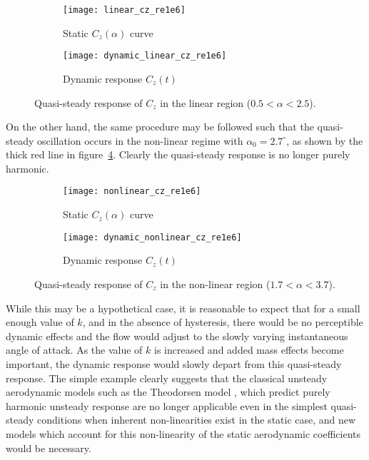 \begin{figure}[h]
	\centering
	\begin{subfigure}[b]{0.45\textwidth}
		\centering
		\texttt{[image: linear\_cz\_re1e6]}
		\caption{Static $C_{z}(\alpha)$ curve}
		\label{fig:static_linear}
	\end{subfigure}
	\begin{subfigure}[b]{0.45\textwidth}
		\centering
		\texttt{[image: dynamic\_linear\_cz\_re1e6]}
		\caption{Dynamic response $C_{z}(t)$}
		\label{fig:dynamic_linear}
	\end{subfigure}
	\caption{Quasi-steady response of $C_{z}$ in the linear region ($0.5<\alpha<2.5$).}
	\label{fig:linear_cz_response}
\end{figure}
On the other hand, the same procedure may be followed such that the quasi-steady oscillation occurs in the non-linear regime with $\alpha_{0}=2.7^{\circ}$, as shown by the thick red line in figure~\ref{fig:static_nonlinear}. Clearly the quasi-steady response is no longer purely harmonic.
\begin{figure}[h]
	\centering
	\begin{subfigure}[b]{0.45\textwidth}
		\centering
		\texttt{[image: nonlinear\_cz\_re1e6]}
		\caption{Static $C_{z}(\alpha)$ curve}
		\label{fig:static_nonlinear}
	\end{subfigure}
	\begin{subfigure}[b]{0.45\textwidth}
		\centering
		\texttt{[image: dynamic\_nonlinear\_cz\_re1e6]}
		\caption{Dynamic response $C_{z}(t)$}
		\label{fig:dynamic_nonlinear}
	\end{subfigure}
	\caption{Quasi-steady response of $C_{z}$ in the non-linear region ($1.7<\alpha<3.7$).}
	\label{fig:nonlinear_cz_response}
\end{figure}
While this may be a hypothetical case, it is reasonable to expect that for a small enough value of $k$, and in the absence of hysteresis, there would be no perceptible dynamic effects and the flow would adjust to the slowly varying instantaneous angle of attack. As the value of $k$ is increased and added mass effects become important, the dynamic response would slowly depart from this quasi-steady response. The simple example clearly suggests that the classical unsteady aerodynamic models such as the Theodorsen model \citep{theodorsen35}, which predict purely harmonic unsteady response are no longer applicable even in the simplest quasi-steady conditions when inherent non-linearities exist in the static case, and new models which account for this non-linearity of the static aerodynamic coefficients would be necessary. 

